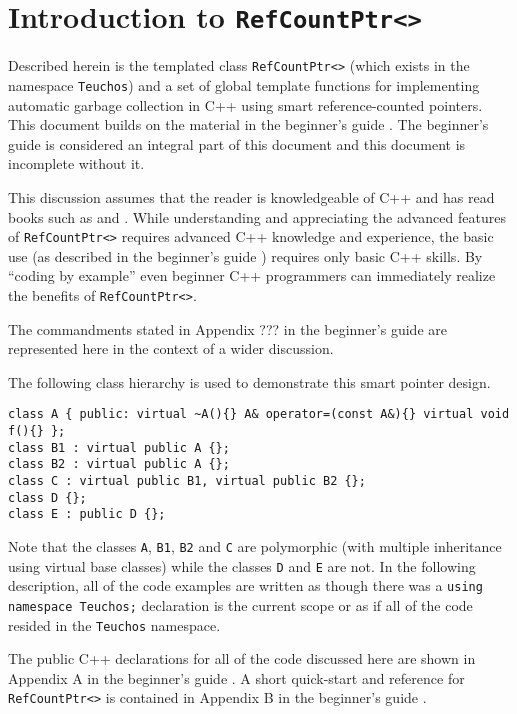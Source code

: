 %
\section{Introduction to {}\texttt{RefCountPtr<>}}
\label{rcp:sec:intro}
%

Described herein is the templated class {}\texttt{RefCountPtr<>}
(which exists in the namespace {}\texttt{Teuchos}) and a set of global
template functions for implementing automatic garbage collection in
C++ using smart reference-counted pointers.  This document builds on
the material in the beginner's guide
{}\cite{ref:RefCountPtrBeginnersGuide}.  The beginner's guide is
considered an integral part of this document and this document is
incomplete without it.

This discussion assumes that the reader is knowledgeable of C++ and
has read books such as {}\cite{ref:stroustrup_2000} and
{}\cite{ref:meyers_1994}.  While understanding and appreciating the
advanced features of {}\texttt{RefCountPtr<>} requires advanced C++
knowledge and experience, the basic use (as described in the
beginner's guide {}\cite{ref:RefCountPtrBeginnersGuide}) requires only
basic C++ skills.  By ``coding by example'' even beginner C++
programmers can immediately realize the benefits of
{}\texttt{RefCountPtr<>}.

The commandments stated in Appendix ??? in the beginner's guide are
represented here in the context of a wider discussion.

The following class hierarchy is used to demonstrate this smart
pointer design.

{\scriptsize\begin{verbatim}
class A { public: virtual ~A(){} A& operator=(const A&){} virtual void f(){} };
class B1 : virtual public A {};
class B2 : virtual public A {};
class C : virtual public B1, virtual public B2 {};
class D {};
class E : public D {};
\end{verbatim}

}Note that the classes {}\texttt{A}, {}\texttt{B1}, {}\texttt{B2} and
{}\texttt{C} are polymorphic (with multiple inheritance using virtual
base classes) while the classes {}\texttt{D} and {}\texttt{E} are not.
In the following description, all of the code examples are written as
though there was a {}\texttt{using namespace Teuchos;} declaration is
the current scope or as if all of the code resided in the
{}\texttt{Teuchos} namespace.

The public C++ declarations for all of the code discussed here are
shown in Appendix A in the beginner's guide
{}\cite{ref:RefCountPtrBeginnersGuide}.  A short quick-start and
reference for {}\texttt{RefCountPtr<>} is contained in Appendix B in
the beginner's guide {}\cite{ref:RefCountPtrBeginnersGuide}.

